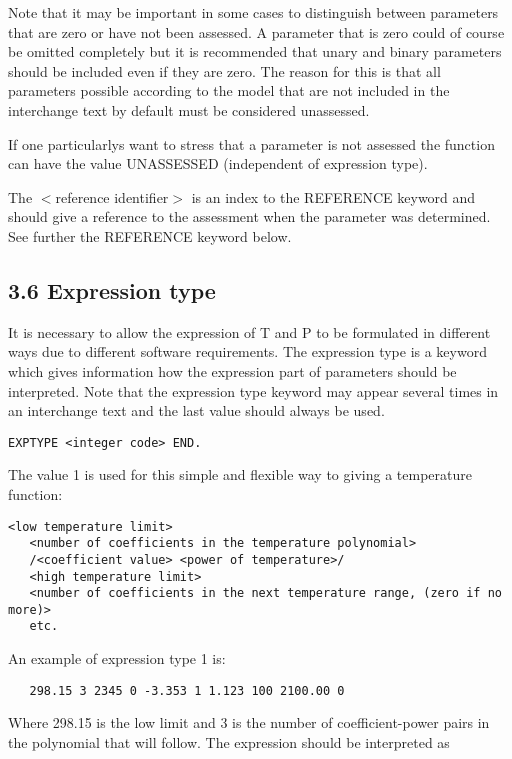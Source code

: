 \documentclass[12pt]{article}
\begin{document}
Note that it may be important in some cases to distinguish between
parameters that are zero or have not been assessed. A parameter that
is zero could of course be omitted completely but it is recommended
that unary and binary parameters should be included even if they are
zero. The reason for this is that all parameters possible according to
the model that are not included in the interchange text by default must be
considered unassessed.

If one particularlys want to stress that a parameter is not assessed
the function can have the value UNASSESSED (independent of expression
type).

The $<$reference identifier$>$ is an index to the REFERENCE keyword and
should give a reference to the assessment when the parameter was
determined. See further the REFERENCE keyword below.

\subsection{3.6 Expression type}

It is necessary to allow the expression of T and P to be formulated in
different ways due to different software requirements. The expression
type is a keyword which gives information how the expression part of
parameters should be interpreted. Note that the expression type
keyword may appear several times in an interchange text and the last value
should always be used.

\begin{verbatim}
EXPTYPE <integer code> END.
\end{verbatim}

The value 1 is used for this simple and flexible way to giving a
temperature function:

\begin{verbatim}
<low temperature limit>
   <number of coefficients in the temperature polynomial>
   /<coefficient value> <power of temperature>/
   <high temperature limit>
   <number of coefficients in the next temperature range, (zero if no more)>
   etc.
\end{verbatim}

An example of expression type 1 is:

\begin{verbatim}
   298.15 3 2345 0 -3.353 1 1.123 100 2100.00 0
\end{verbatim}

Where 298.15 is the low limit and 3 is the number of coefficient-power pairs in
the polynomial that will follow. The expression should be interpreted as
\end{document}
